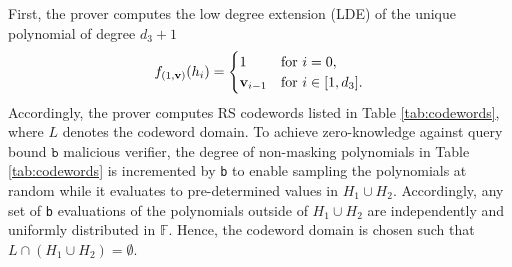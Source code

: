 %
%
%
%


First, the prover computes the low degree extension (LDE) of the unique polynomial of degree $d_3+1$
\begin{equation*}
	f_{(1,{\bf{v}})}(h_i) = \begin{cases}
		1 & \text{for $i = 0$},\\
		{\bf{v}}_{i-1} &  \text{for $i \in [1, d_3]$}.
	\end{cases}
\end{equation*}
Accordingly, the prover computes RS codewords listed in Table \ref{tab:codewords}, where $L$ denotes the codeword domain. To achieve zero-knowledge against query bound $\texttt{b}$ malicious verifier, the degree of non-masking polynomials in Table \ref{tab:codewords} is incremented by \texttt{b} to enable sampling the polynomials at random while it evaluates to pre-determined values in $H_1 \cup H_2$. Accordingly, any set of \texttt{b} evaluations of the polynomials outside of $H_1 \cup H_2$ are independently and uniformly distributed in $\mathbb{F}$. Hence, the codeword domain is chosen such that  $L \cap (H_1 \cup H_2) = \emptyset$. 

